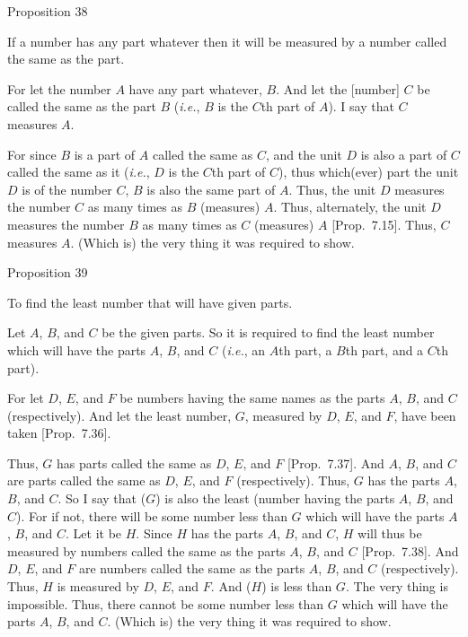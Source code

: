 
\begin{center}
{\large Proposition 38}
\end{center}

If a number has any part whatever then it will
be measured by a number called the same as the part.

\epsfysize=1.2in
\centerline{}

For let the number $A$ have any part whatever, $B$. And let the [number]
$C$ be called the same as the part $B$ ({\em i.e.}, $B$ is the $C$th part of $A$). I say that $C$ measures $A$.

For since $B$ is a part of $A$ called the same as $C$,  and the unit $D$ is also
a part of $C$ called the same as it ({\em i.e.}, $D$ is the $C$th part of $C$), thus which(ever) part the unit $D$ is of the
number $C$, $B$ is also the same part of $A$. Thus, 
the unit $D$ measures the number $C$ as many times as $B$  (measures)
$A$. Thus, alternately, the unit $D$ measures the number $B$
as many times as $C$  (measures) $A$ [Prop.~7.15]. Thus, $C$ measures $A$. (Which is)
the very thing it was required to show.


\begin{center}
{\large Proposition 39}
\end{center}

To find the least number that will have given
parts.\\

\epsfysize=2.2in
\centerline{}

Let $A$, $B$, and $C$ be the given parts. So it is required to find the
least  number which will have the parts $A$, $B$, and $C$ ({\em i.e.}, an $A$th part, a $B$th part, and a $C$th part).

For let  $D$, $E$, and $F$ be numbers having the same names as
the parts $A$, $B$, and $C$ (respectively). And let the least number, $G$,
measured by $D$, $E$, and $F$, have been taken [Prop.~7.36].

Thus, $G$ has parts called the same as $D$, $E$, and $F$ [Prop.~7.37]. And $A$, $B$, and $C$ are 
parts called the same as $D$, $E$, and $F$ (respectively). Thus, $G$ has the parts $A$, $B$, and $C$. So I say that ($G$) is also the least (number having the parts $A$, $B$, and $C$). For if not, there will be some number less than $G$ which will have the parts $A$, $B$, and $C$. Let it be
$H$. Since $H$ has the parts $A$, $B$, and $C$, $H$ will thus be measured
by numbers called the same as the parts $A$, $B$, and $C$  [Prop.~7.38]. And $D$, $E$, and $F$ are numbers called the same as the parts $A$, $B$, and $C$ (respectively). Thus, $H$ is measured by $D$, $E$, and $F$. And ($H$) is less than $G$. The
very thing is impossible. Thus, there cannot be some number less than $G$
which will have the parts $A$, $B$, and $C$. (Which is) the very thing it
was required to show.

\newpage
\thispagestyle{plain}
~\\